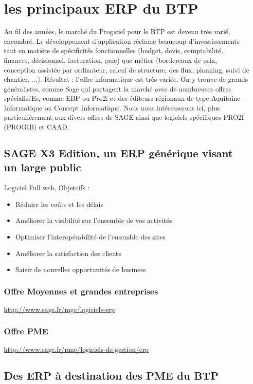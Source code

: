 \section{les principaux ERP du BTP}
Au fil des années, le marché du Progiciel pour le BTP est devenu très varié, encombré. 
Le développement d'application réclame beaucoup d'investissements tant en matière de spécificités fonctionnelles (budget, devis, comptabilité, finances, décisionnel, facturation, paie) que métier (bordereaux de prix, conception assistée par ordinateur, calcul de structure, des flux, planning, suivi de chantier, ...). 
Résultat : l'offre informatique est très variée. On y trouve de grands généralistes, comme Sage qui partagent la marché avec de nombreuses offres spécialiséEs, comme EBP ou Pro2i et des éditeurs régionaux de type Aquitaine Informatique ou Concept Informatique.
Nous nous intéresserons ici, plus particulièrement aux divers offres de SAGE ainsi que logiciels spécifiques PRO2I (PROGIB) et CAAD.
\subsection{SAGE X3 Edition, un ERP générique visant un large public}
Logiciel Full web,
Objetcifs :
\begin{itemize}
    \item Réduire les coûts et les délais
    \item Améliorer la visibilité sur l'ensemble de vos activités
	\item Optimiser l'interopérabilité de l'ensemble des sites
    \item Améliorer la satisfaction des clients
	\item Saisir de nouvelles opportunités de business
\end{itemize}

\subsubsection{Offre Moyennes et grandes entreprises}
\url{http://www.sage.fr/mge/logiciels-erp}
\subsubsection{Offre PME}
\url{http://www.sage.fr/pme/logiciels-de-gestion/erp}

\subsection{Des ERP à destination des PME du BTP}
